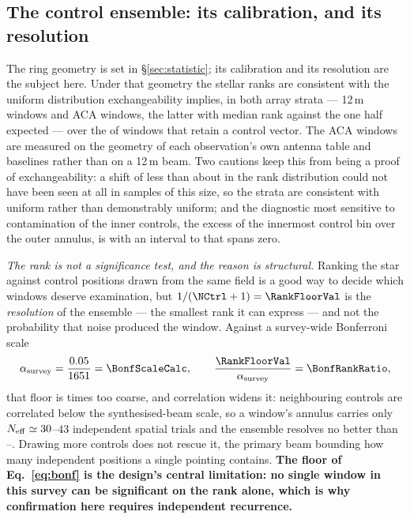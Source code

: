 \subsection{The control ensemble: its calibration, and its resolution}

The ring geometry is set in \S\ref{sec:statistic}; its calibration and its
resolution are the subject here. Under that geometry the stellar ranks are
consistent with the uniform distribution exchangeability implies, in both
array strata --- \VerTwmAfterN{} 12\,m windows and \VerAcaAfterN{} ACA
windows, the latter with median rank \VerAcaAfterMed{} against the one half
expected --- over the \VerNTested{} of \NWindows{} windows that retain a
control vector. The ACA windows are measured on the geometry of each
observation's own antenna table and baselines rather than on a 12\,m beam.
Two cautions keep this from being a proof of exchangeability: a shift of less
than about \VerKsPowerAca{} in the rank distribution could not have been seen
at all in samples of this size, so the strata are consistent with uniform
rather than demonstrably uniform; and the diagnostic most sensitive to
contamination of the inner controls, the excess of the innermost control bin
over the outer annulus, is \VerAcaAfterExc{} with an interval
\VerAcaAfterExcLo{} to \VerAcaAfterExcHi{} that spans zero.

\emph{The rank is not a significance test, and the reason is structural.}
Ranking the star against \NCtrl{} control positions drawn from the same field
is a good way to decide which windows deserve examination, but
$1/(\NCtrl+1)=\RankFloorVal$ is the \emph{resolution} of the ensemble --- the
smallest rank it can express --- and not the probability that noise produced
the window. Against a survey-wide Bonferroni scale
%
\begin{equation}
\alpha_{\rm survey}=\frac{0.05}{\NWindows}=\BonfScaleCalc,
\qquad
\frac{\RankFloorVal}{\alpha_{\rm survey}}=\BonfRankRatio,
\label{eq:bonf}
\end{equation}
%
that floor is \BonfRankRatio{} times too coarse, and correlation widens it:
neighbouring controls are correlated below the synthesised-beam scale, so a
window's annulus carries only $N_{\rm eff}\simeq30$--$43$ independent spatial
trials and the ensemble resolves no better than \RankEffLo--\RankEffHi.
Drawing more controls does not rescue it, the primary beam bounding how many
independent positions a single pointing contains. \textbf{The floor of
Eq.~\ref{eq:bonf} is the design's central limitation: no single window in
this survey can be significant on the rank alone, which is why confirmation
here requires independent recurrence.}

